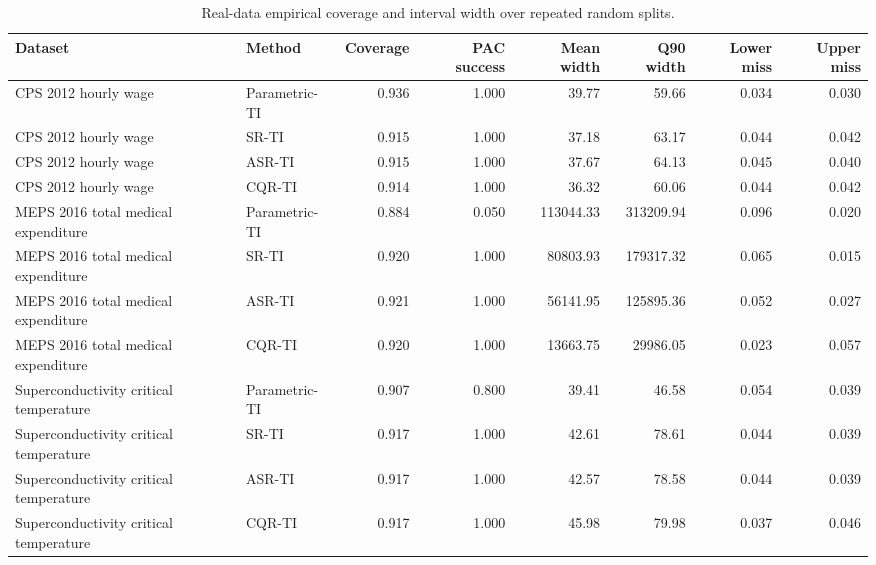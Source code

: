 \begin{table}[t]
\centering
\caption{Real-data empirical coverage and interval width over repeated random splits.}
\label{tab:real-data-new}
\begin{tabular}{llrrrrrr}
\toprule
Dataset & Method & Coverage & PAC success & Mean width & Q90 width & Lower miss & Upper miss \\
\midrule
CPS 2012 hourly wage & Parametric-TI & 0.936 & 1.000 & 39.77 & 59.66 & 0.034 & 0.030 \\
CPS 2012 hourly wage & SR-TI & 0.915 & 1.000 & 37.18 & 63.17 & 0.044 & 0.042 \\
CPS 2012 hourly wage & ASR-TI & 0.915 & 1.000 & 37.67 & 64.13 & 0.045 & 0.040 \\
CPS 2012 hourly wage & CQR-TI & 0.914 & 1.000 & 36.32 & 60.06 & 0.044 & 0.042 \\
MEPS 2016 total medical expenditure & Parametric-TI & 0.884 & 0.050 & 113044.33 & 313209.94 & 0.096 & 0.020 \\
MEPS 2016 total medical expenditure & SR-TI & 0.920 & 1.000 & 80803.93 & 179317.32 & 0.065 & 0.015 \\
MEPS 2016 total medical expenditure & ASR-TI & 0.921 & 1.000 & 56141.95 & 125895.36 & 0.052 & 0.027 \\
MEPS 2016 total medical expenditure & CQR-TI & 0.920 & 1.000 & 13663.75 & 29986.05 & 0.023 & 0.057 \\
Superconductivity critical temperature & Parametric-TI & 0.907 & 0.800 & 39.41 & 46.58 & 0.054 & 0.039 \\
Superconductivity critical temperature & SR-TI & 0.917 & 1.000 & 42.61 & 78.61 & 0.044 & 0.039 \\
Superconductivity critical temperature & ASR-TI & 0.917 & 1.000 & 42.57 & 78.58 & 0.044 & 0.039 \\
Superconductivity critical temperature & CQR-TI & 0.917 & 1.000 & 45.98 & 79.98 & 0.037 & 0.046 \\
\bottomrule
\end{tabular}
\end{table}
